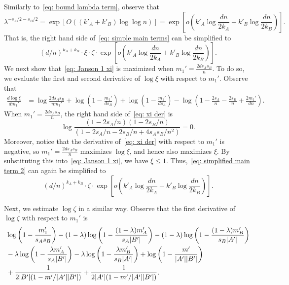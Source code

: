 \documentclass[11pt]{article}
\theoremstyle{plain}
\begin{document}
 Similarly to~\eqref{eq: bound lambda term}, observe that 
 $$\lambda ^{-s_A/2 - s_B/2} = \exp[O((k'_A + k'_B)\log\log n)]= \exp\left[o\left(k'_A\log \frac{dn}{2k_A} + k'_B\log\frac{dn}{2k_B}\right)\right].$$
 That is, the right hand side of~\eqref{eq: simple main terms} can be simplified to 
 \begin{equation}\label{eq: simplified main term 2}
     (d/n)^{k_A + k_B}\cdot \xi \cdot \zeta \cdot \exp\left[o\left(k'_A\log\frac{dn}{2k_A} + k'_B\log\frac{dn}{2k_B}\right)\right].
 \end{equation}
 We next show that~\eqref{eq: Janson 1 xi} is maximized when $m_1' = \frac{2ds_As_B}{n}$.
 To do so, we evaluate the first and second derivative of $\log \xi$ with respect to $m_1'$. Observe that 
\begin{align}
    \frac{d\log \xi}{dm_1'} &=\log\frac{2ds_As_B}{nm_1'} + \log\left(1 - \frac{m_1'}{ds_B}\right)  + \log\left(1 - \frac{m_1'}{ds_A}\right)  - \log\left(1 - \frac{2s_A}{n} - \frac{2s_B}{n}  +\frac{2m_1'}{dn}\right).\label{eq: xi der}
\end{align}
When $m_1' = \frac{2ds_As_B}{n}$, the right hand side of~\eqref{eq: xi der} is 
\[
    \log\frac{(1 - 2s_A/n)(1 - 2s_B/n)}{(1 - 2s_A/n - 2s_B/n + 4s_As_B/n^2)} = 0.
\]
Moreover, notice that the derivative of~\eqref{eq: xi der} with respect to $m_1'$ is negative, so $m_1' = \frac{2ds_As_B}{n}$ maximizes $\log \xi$, and hence also maximizes $\xi$. By substituting this into~\eqref{eq: Janson 1 xi}, we have $\xi \leq 1$.
Thus,~\eqref{eq: simplified main term 2} can again be simplified to
\begin{equation}
    (d/n)^{k_A + k_B}\cdot\zeta\cdot\exp\left[o\left(k'_A\log\frac{dn}{2k_A} + k'_B\log\frac{dn}{2k_B}\right)\right].
\end{equation}

Next, we estimate $\log\zeta$ in a similar way. Observe that the first derivative of $\log \zeta$ with respect to $m_1'$ is
\begin{align}
    & \log\left(1 - \frac{m_1'}{s_As_B}\right) -(1 - \lambda ) \log\left(1 - \frac{(1 - \lambda )m'_A}{s_A|B'|}\right) - (1 - \lambda )\log\left(1 - \frac{(1 - \lambda )m'_B}{s_B|A'|}\right) \notag\\
    & -\lambda \log\left(1 - \frac{\lambda m'_A}{s_A|B'|}\right)  - \lambda \log\left(1 - \frac{\lambda m'_B}{s_B|A'|}\right)  + \log\left(1 - \frac{m'}{|A'||B'|}\right) \notag\\
    &+ \frac{1}{2|B'|(1 - m'/|A'||B'|)} + \frac{1}{2|A'|(1 - m'/|A'||B'|)}.\label{eq: zeta der}
\end{align}
\end{document}
